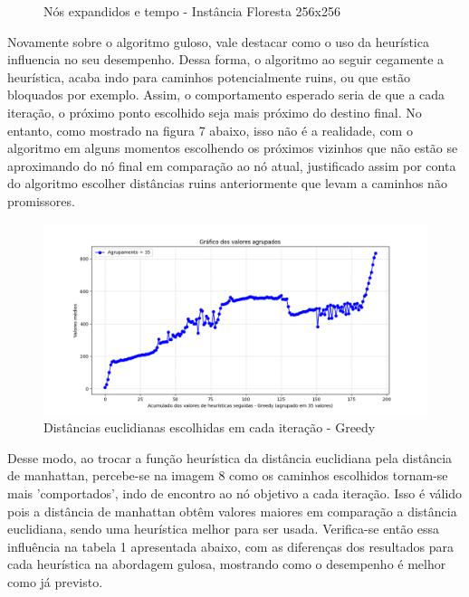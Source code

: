 \documentclass[10pt]{extarticle} %
\begin{document}
\begin{figure}[H]
\begin{minipage}{0.5\linewidth}
        \caption{Nós expandidos e tempo - Instância Floresta 256x256}
        \label{fig:expanded-nodes-vs-time}
    \end{minipage}
\end{figure}

Novamente sobre o algoritmo guloso, vale destacar como o uso da heurística influencia no seu desempenho. Dessa forma, o algoritmo ao seguir cegamente a heurística, acaba indo para caminhos potencialmente ruins, ou que estão bloquados por exemplo. Assim, o comportamento esperado seria de que a cada iteração, o próximo ponto escolhido seja mais próximo do destino final. No entanto, como mostrado na figura 7 abaixo, isso não é a realidade, com o algoritmo em alguns momentos escolhendo os próximos vizinhos que não estão se aproximando do nó final em comparação ao nó atual, justificado assim por conta do algoritmo escolher distâncias ruins anteriormente que levam a caminhos não promissores. 

\begin{figure}[H]
    \centering
    \includegraphics[width=0.9\linewidth]{greedy_alg_dist_cumulative.png}
    \caption{Distâncias euclidianas escolhidas em cada iteração - Greedy}
    \label{fig:enter-label}
\end{figure}

Desse modo, ao trocar a função heurística da distância euclidiana pela distância de manhattan, percebe-se na imagem 8 como os caminhos escolhidos tornam-se mais 'comportados', indo de encontro ao nó objetivo a cada iteração. Isso é válido pois a distância de manhattan obtêm valores maiores em comparação a distância euclidiana, sendo uma heurística melhor para ser usada. Verifica-se então essa influência na tabela 1 apresentada abaixo, com as diferenças dos resultados para cada heurística na abordagem gulosa, mostrando como o desempenho é melhor como já previsto.
\end{document}
